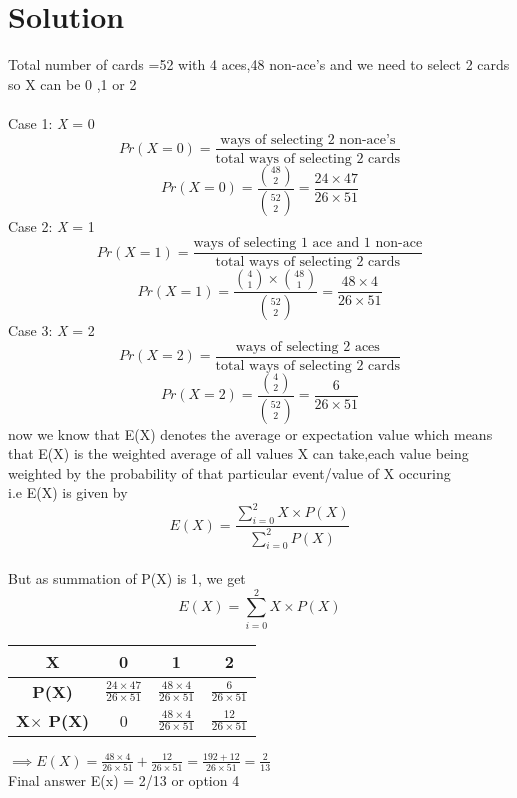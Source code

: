 \documentclass[journal,12pt,twocolumn]{IEEEtran}
\begin{document}
\section{Solution}
Total number of cards =52 with 4 aces,48 non-ace's and we need to select 2 cards
so X can be 0 ,1 or 2\\ \\
Case 1: \emph{X} = 0\\
    \[Pr(X=0) = \frac{\mbox{ways of selecting 2 non-ace's}}{\mbox{total ways of selecting 2 cards}}\]
    \[Pr(X=0) = \frac{{48\choose 2}}{{52\choose2}} = \frac{24\times47}{26\times51}\]
Case 2: \emph{X} = 1\\    
    \[Pr(X=1) = \frac{\mbox{ways of selecting 1 ace and 1 non-ace}}{\mbox{total ways of selecting 2 cards}}\]
    \[Pr(X=1) = \frac{{4\choose1}\times{48\choose1}}{{52\choose2}} = \frac{48\times4}{26\times51}\]
Case 3: \emph{X} = 2\\
    \[Pr(X=2) = \frac{\mbox{ways of selecting 2 aces}}{\mbox{total ways of selecting 2 cards}}\]
    \[Pr(X=2) = \frac{{4 \choose 2}}{{52 \choose 2}} = \frac{6}{26\times51}\] 
 now we know that E(X) denotes the average or expectation value which means that E(X) is the weighted average of all values X can take,each value being weighted by the probability of that particular event/value of X occuring\\  
 i.e E(X) is given by\[E(X) = \frac{\sum_{i=0}^2 X\times P(X) }{\sum_{i=0}^2 P(X)}\]\\
 But as summation of P(X) is 1,
 we get\[ E(X)=\sum_{i=0}^2 X\times P(X)\]    
\begin{center}
\begin{tabular}{|c|c|c|c|}
\hline
\textbf{X} & 0 & 1 & 2  \\
\hline
\textbf{P(X)} & $\frac {24\times47}{26\times51}$ & $\frac {48\times4}{26\times51}$ & $\frac {6}{26\times51}$ \\
\hline
\textbf{X$\times$ P(X)} & 0 & $\frac {48\times4}{26\times51}$ & $\frac {12}{26\times51}$  \\
\hline 
\end{tabular}
\end{center}
$\implies E(X) = \frac{48\times4}{26\times51} +\frac{12}{26\times51} =\frac{192+12}{26\times51}=\frac{2}{13}$\\

Final answer E(x) = 2/13 or option 4
\end{document}
